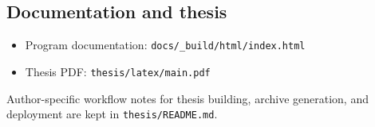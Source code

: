 \documentclass[a4paper,11pt]{article}
\begin{document}
\subsection*{Documentation and thesis}

\begin{itemize}

  \item Program documentation: \texttt{docs/\_build/html/index.html}

  \item Thesis PDF: \texttt{thesis/latex/main.pdf}

\end{itemize}

Author-specific workflow notes for thesis building, archive generation, and deployment are kept in \texttt{thesis/README.md}.
\end{document}
